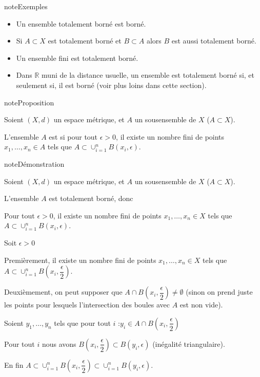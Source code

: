 \documentclass[letterpaper,10pt,french]{sphinxmanual}
\begin{document}
\begin{sphinxadmonition}{note}{Exemples}
\begin{itemize}
\item {} 
\sphinxAtStartPar
Un ensemble totalement borné est borné.

\item {} 
\sphinxAtStartPar
Si \(A\subset X\) est totalement borné et \(B\subset A\) alors \(B\) est aussi totalement borné.

\item {} 
\sphinxAtStartPar
Un ensemble fini est totalement borné.

\item {} 
\sphinxAtStartPar
Dans \(\mathbb R\) muni de la distance usuelle, un ensemble est totalement borné si, et seulement si, il est borné (voir plus loins dans cette section).

\end{itemize}
\end{sphinxadmonition}

\begin{sphinxadmonition}{note}{Proposition}

\sphinxAtStartPar
Soient \((X, d)\) un espace métrique, et \(A\) un sous\sphinxhyphen{}ensemble de \(X\) (\(A\subset X\)).

\sphinxAtStartPar
L’ensemble \(A\) est  si pour tout \(\epsilon>0\), il existe un nombre fini de points \(x_1, \ldots, x_n \in A\) tels que \(A\subset \cup_{i=1}^nB(x_i, \epsilon)\).
\end{sphinxadmonition}

\begin{sphinxadmonition}{note}{Démonstration}

\sphinxAtStartPar
Soient \((X, d)\) un espace métrique, et \(A\) un sous\sphinxhyphen{}ensemble de \(X\) (\(A\subset X\)).

\sphinxAtStartPar
L’ensemble \(A\) est totalement borné, donc

\sphinxAtStartPar
Pour tout \(\epsilon>0\), il existe un nombre fini de points \(x_1, \ldots, x_n \in X\) tels que \(A\subset \cup_{i=1}^nB(x_i, \epsilon)\).

\sphinxAtStartPar
Soit \(\epsilon>0\)

\sphinxAtStartPar
Premièrement, il existe un nombre fini de points \(x_1, \ldots, x_n \in X\) tels que \(A\subset \cup_{i=1}^nB(x_i, \dfrac{\epsilon}{2})\).

\sphinxAtStartPar
Deuxièmement, on peut supposer que \(A\cap B(x_i, \dfrac{\epsilon}{2}) \neq \emptyset\) (sinon on prend juste les points pour lesquels l’intersection des boules avec \(A\) est non vide).

\sphinxAtStartPar
Soient \(y_1, \ldots, y_n\) tels que pour tout \(i\) :\(y_i \in A\cap B(x_i, \dfrac{\epsilon}{2})\)

\sphinxAtStartPar
Pour tout \(i\) nous avons \(B(x_i, \dfrac{\epsilon}{2})\subset B(y_i, \epsilon)\) (inégalité triangulaire).

\sphinxAtStartPar
En fin \(A\subset \cup_{i=1}^nB(x_i, \dfrac{\epsilon}{2})\subset  \cup_{i=1}^nB(y_i, \epsilon)\).
\end{sphinxadmonition}
\end{document}
